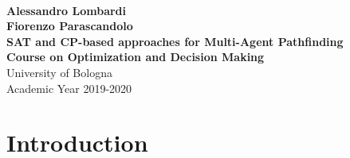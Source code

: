 \documentclass[12pt, a4paper, hidelinks]{article}
\numberwithin{equation}{section}
\begin{document}
\begin{titlepage}
\begin{center}
\hspace{0pt}\\
\vspace{4cm}
{\large\bfseries Alessandro Lombardi}\\[5pt]
{\large\bfseries Fiorenzo Parascandolo}\\
\vspace{3cm}
{\LARGE\bfseries SAT and CP-based approaches for Multi-Agent Pathfinding}\\
\vspace{0.8cm}
{\Large\bfseries Course on Optimization and Decision Making}\\[10pt]
\vspace{0.8cm}
\large University of Bologna\\
\large Academic Year 2019-2020
\vfill
\begin{abstract}
Multi-Agent Pathfinding (MAPF) is a problem with practical implications in several fields: from robotics and self-driving cars to transportation and logistics.
The task is to find non-conflicting paths for a set of agents given their starting positions and destinations, usually minimizing a cost function.
There are many variations on the classical problem and many approaches have been proposed.
In this work we will focus on SAT and CP-based approaches following the paper of R. Barták, J. Švancara and M. Vlk, ``A Scheduling-Based Approach to Multi-Agent Path Finding with Weighted and Capacitated Arcs'', published in Proceedings of the 17th International Conference on Autonomous Agents and MultiAgent Systems.
As the authors suggest, this type of problem lends itself particularly well to be formalized using a compact set of constraints and we found interesting to developed as a project for our Optimization and Decision Making course.
\end{abstract}
\end{center}
\end{titlepage}

\newpage

\section*{Introduction}\label{sec:introduction}
\end{document}
